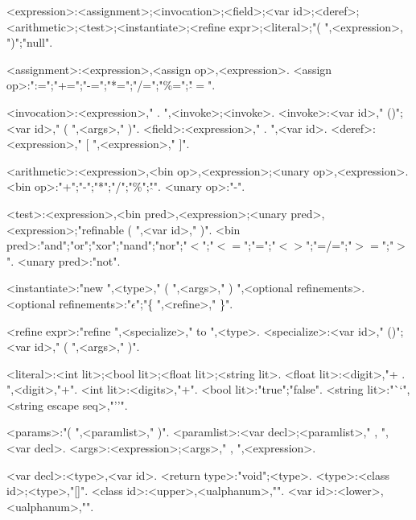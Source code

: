 \begin{grammar}
<expression>:<assignment>;<invocation>;<field>;<var id>;<deref>;<arithmetic>;<test>;<instantiate>;<refine expr>;<literal>;"( ",<expression>, ")";"null".

<assignment>:<expression>,<assign op>,<expression>.
<assign op>:":=";"+=";"-=";"*=";"/=";"\%=";"$\hat{}=$".

<invocation>:<expression>," . ",<invoke>;<invoke>.
<invoke>:<var id>," ()";<var id>," ( ",<args>," )".
<field>:<expression>," . ",<var id>.
<deref>:<expression>," [ ",<expression>," ]".

<arithmetic>:<expression>,<bin op>,<expression>;<unary op>,<expression>.
<bin op>:"+";"-";"*";"/";"\%";"$\hat{}$".
<unary op>:"-".

<test>:<expression>,<bin pred>,<expression>;<unary pred>,<expression>;"refinable ( ",<var id>," )".
<bin pred>:"and";"or";"xor";"nand";"nor";"$<$";"$<=$";"=";"$<>$";"=/=";"$>=$";"$>$".
<unary pred>:"not".

<instantiate>:"new ",<type>," ( ",<args>," ) ",<optional refinements>.
<optional refinements>:"$\epsilon$";"\{ ",<refine>,"{\small *} \}".

<refine expr>:"refine ",<specialize>," to ",<type>.
<specialize>:<var id>," ()";<var id>," ( ",<args>," )".

<literal>:<int lit>;<bool lit>;<float lit>;<string lit>.
<float lit>:<digit>,"{\small +} . ",<digit>,"{\small +}".
<int lit>:<digits>,"{\small +}".
<bool lit>:"true";"false".
<string lit>:"``",<string escape seq>,"''".

<params>:"( ",<paramlist>," )".
<paramlist>:<var decl>;<paramlist>," , ",<var decl>.
<args>:<expression>;<args>," , ",<expression>.

<var decl>:<type>,<var id>.
<return type>:"void";<type>.
<type>:<class id>;<type>,"[]".
<class id>:<upper>,<ualphanum>,"{\small *}".
<var id>:<lower>,<ualphanum>,"{\small *}".

\end{grammar}
